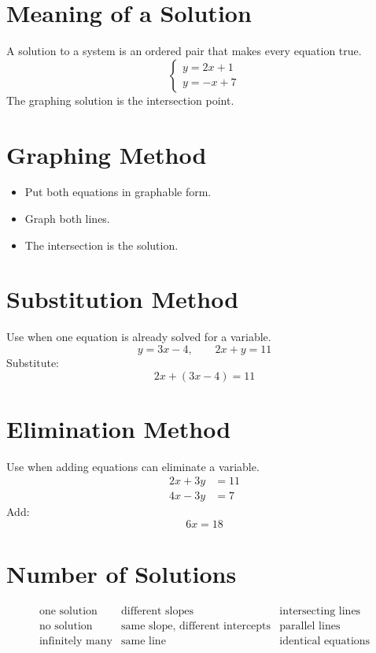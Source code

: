 \documentclass[11pt]{article}
\begin{document}

\section*{Meaning of a Solution}
A solution to a system is an ordered pair that makes every equation true.
\[
\begin{cases}
y=2x+1\\
y=-x+7
\end{cases}
\]
The graphing solution is the intersection point.

\section*{Graphing Method}
\begin{itemize}
  \item Put both equations in graphable form.
  \item Graph both lines.
  \item The intersection is the solution.
\end{itemize}

\section*{Substitution Method}
Use when one equation is already solved for a variable.
\[
y=3x-4,\qquad 2x+y=11
\]
Substitute:
\[
2x+(3x-4)=11
\]

\section*{Elimination Method}
Use when adding equations can eliminate a variable.
\[
\begin{aligned}
2x+3y&=11\\
4x-3y&=7
\end{aligned}
\]
Add:
\[
6x=18
\]

\section*{Number of Solutions}
\[
\begin{array}{lll}
\text{one solution} & \text{different slopes} & \text{intersecting lines}\\
\text{no solution} & \text{same slope, different intercepts} & \text{parallel lines}\\
\text{infinitely many} & \text{same line} & \text{identical equations}
\end{array}
\]
\end{document}

